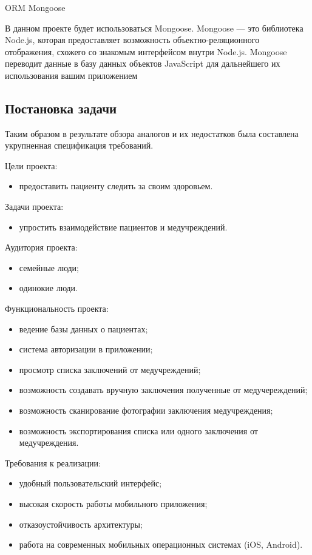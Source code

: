 \subsubsection{}ORM Mongoose

 В данном проекте будет использоваться Mongoose.
Mongoose — это библиотека Node.js, которая предоставляет возможность объектно-реляционного отображения, схожего со знакомым интерфейсом внутри Node.js. Mongoose переводит данные в базу данных объектов JavaScript для дальнейшего их использования вашим приложением


\subsection{Постановка задачи } %
\label{sub:domain:existing_tasked}
Таким образом в результате обзора аналогов и их недостатков была составлена укрупненная спецификация требований.

Цели проекта:
\begin{itemize}
  \item предоставить пациенту следить за своим здоровьем.
\end{itemize}

Задачи проекта:
\begin{itemize}
  \item упростить взаимодействие пациентов и медучреждений.
\end{itemize}

Аудитория проекта:
\begin{itemize}
  \item семейные люди;
  \item одинокие люди.
\end{itemize}

Функциональность проекта:
\begin{itemize}
  \item ведение базы данных о пациентах;
  \item система авторизации в приложении;
  \item просмотр списка заключений от медучреждений;
  \item возможность создавать вручную заключения полученные от медучереждений;
  \item возможность сканирование фотографии заключения медучреждения;
  \item возможность экспортирования списка или одного заключения от медучреждения.
\end{itemize}

Требования к реализации:
\begin{itemize}
  \item удобный пользовательский интерфейс;
  \item высокая скорость работы мобильного приложения;
  \item отказоустойчивость архитектуры;
  \item работа на современных мобильных операционных системах (iOS, Android).
\end{itemize}
